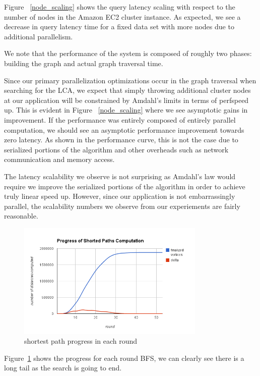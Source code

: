 \documentclass{article}
\begin{document}
Figure ~\ref{node_scaling} shows the query latency scaling with respect to the number of nodes in the Amazon EC2 cluster instance.
As expected, we see a decrease in query latency time for a fixed data set with more nodes due to additional parallelism.

We note that the performance of the system is composed of roughly two phases: building the graph and actual graph traversal time.

Since our primary parallelization optimizations occur in the graph traversal when searching for the LCA, we expect that simply throwing additional cluster nodes at our application will be constrained by Amdahl's limits in terms of  perfspeed up.
This is evident in Figure ~\ref{node_scaling} where we see asymptotic gains in improvement. 
If the performance was entirely composed of entirely parallel computation, we should see an asymptotic performance improvement towards zero latency.
As shown in the performance curve, this is not the case due to serialized portions of the algorithm and other overheads such as network communication and memory access.

The latency scalability we observe is not surprising as Amdahl's law would require we improve the serialized portions of the algorithm in order to achieve truly linear speed up.
However, since our application is not embarrassingly parallel, the scalability numbers we observe from our experiements are fairly reasonable.

\begin{figure}
    \centering
        \includegraphics[width=0.8\textwidth]{sssp.png}
    \caption{shortest path progress in each round}
    \label{fig:shortest_path}
\end{figure}

Figure~\ref{fig:shortest_path} shows the progress for each round BFS, we can
clearly see there is a long tail as the search is going to end.
\end{document}
